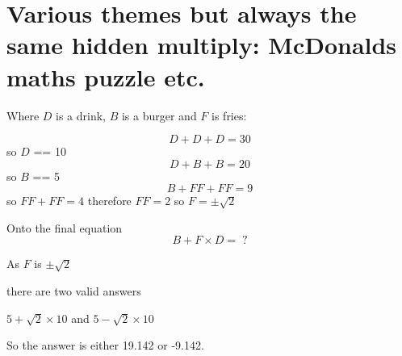 \documentclass[a4paper,10pt]{article}
\title{}
\author{}
\begin{document}
\maketitle

\begin{abstract}

\end{abstract}

\section{Various themes but always the same hidden multiply: McDonalds maths puzzle etc.}

Where $D$ is a drink, $B$ is a burger and $F$ is fries:

$$ D + D + D = 30 $$
so $D$ == 10
$$ D + B + B = 20 $$
so $B$ == 5
$$ B + FF + FF = 9 $$
so $FF + FF = 4$ therefore $FF=2$ so $F=\pm \sqrt{2}$

Onto the final equation
$$B + F \times D = \; ? $$

As $F$ is  $\pm \sqrt{2}$ 

there are two valid answers

$ 5 + \sqrt{2} \times 10 $ and $ 5 - \sqrt{2} \times 10 $

So the answer is either 19.142 or -9.142.
\end{document}
